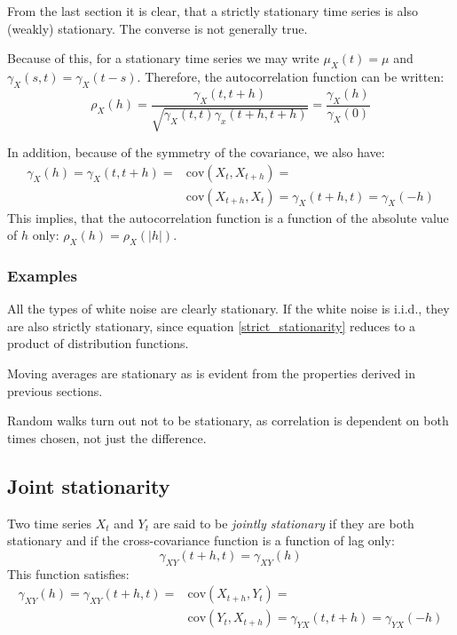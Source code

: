 \documentclass[12pt, a4paper]{article}
\numberwithin{equation}{section}
\begin{document}
From the last section it is clear, that a strictly stationary time series is also (weakly) stationary. The converse is not generally true.

Because of this, for a stationary time series we may write $\mu_X(t)=\mu$ and $\gamma_X(s,t)=\gamma_X(t-s)$. Therefore, the autocorrelation function can be written:
\begin{equation}
\rho_X(h)=\frac{\gamma_X(t,t+h)}{\sqrt{\gamma_X(t,t)\gamma_x(t+h,t+h)}}=\frac{\gamma_X(h)}{\gamma_X(0)}
\end{equation}

In addition, because of the symmetry of the covariance, we also have:
\begin{align}
\gamma_X(h)=\gamma_X(t,t+h)=&\textrm{cov}(X_t,X_{t+h})=\\
&\textrm{cov}(X_{t+h},X_t)=\gamma_X(t+h,t)=\gamma_X(-h)
\end{align}
This implies, that the autocorrelation function is a function of the absolute value of $h$ only: $\rho_X(h)=\rho_X(|h|)$.

\subsubsection{Examples}
All the types of white noise are clearly stationary. If the white noise is i.i.d., they are also strictly stationary, since equation \ref{strict_stationarity} reduces to a product of distribution functions.

Moving averages are stationary as is evident from the properties derived in previous sections.

Random walks turn out not to be stationary, as correlation is dependent on both times chosen, not just the difference.

\subsection{Joint stationarity}
Two time series $X_t$ and $Y_t$ are said to be \textit{jointly stationary} if they are both stationary and if the cross-covariance function is a function of lag only:
\begin{equation}
\gamma_{XY}(t+h,t)=\gamma_{XY}(h)
\end{equation}
This function satisfies:
\begin{align}
\gamma_{XY}(h)=\gamma_{XY}(t+h,t)=&\textrm{cov}(X_{t+h},Y_t)=\\
&\textrm{cov}(Y_t,X_{t+h})=\gamma_{YX}(t,t+h)=\gamma_{YX}(-h)
\end{align}
\end{document}
